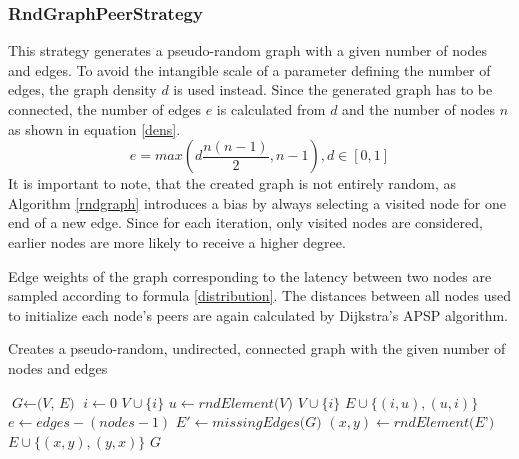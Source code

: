 \documentclass[a4paper,12pt,twoside]{report}
\begin{document}
\subsubsection{RndGraphPeerStrategy} \label{rndgraphstrategy}
This strategy generates a pseudo-random graph with a given number of nodes and edges. To avoid the intangible scale of a parameter defining the number of edges, the graph density $d$ is used instead. Since the generated graph has to be connected, the number of edges $e$ is calculated from $d$ and the number of nodes $n$ as shown in equation \ref{dens}. 
\begin{equation}\label{dens}
e = max \left( d\frac{n\left( n-1\right) }{2}, n-1 \right), d\in [0,1]
\end{equation}
It is important to note, that the created graph is not entirely random, as Algorithm \ref{rndgraph} introduces a bias by always selecting a visited node for one end of a new edge. Since for each iteration, only visited nodes are considered, earlier nodes are more likely to receive a higher degree.\cite{stackoverflow} 

Edge weights of the graph corresponding to the latency between two nodes are sampled according to formula \ref{distribution}. The distances between all nodes used to initialize each node's peers are again calculated by Dijkstra's APSP algorithm. 
\begin{algorithm}
\caption{Creates a pseudo-random, undirected, connected graph with the given number of nodes and edges}\label{rndgraph}
\begin{algorithmic}[1]
\State $\textit{G} \gets \textit{(V, E)}$
\State $i \gets 0$
\State $V \cup \{i \}$
\State $u \gets \textit{rndElement(V)}$
\State $V \cup \{i \}$
\State $E \cup \{(i,u),(u,i) \}$
\EndWhile
\State $e \gets edges - (nodes-1)$
\State $E' \gets \textit{missingEdges(G)}$
\State $(x,y) \gets \textit{rndElement(E')}$
\State $E \cup \{(x,y),(y,x) \}$
\EndWhile
\State \Return $G$
\EndProcedure
\end{algorithmic}
\end{algorithm}
\end{document}
